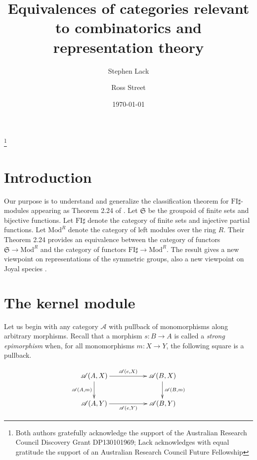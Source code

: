 \documentclass[a4paper,12pt,reqno]{amsart}
\theoremstyle{definition}
\theoremstyle{fact}
\theoremstyle{genquest}
\theoremstyle{step}
\newcommand{\lra}{\longrightarrow}
\def\CA{{\mathscr A}}
\begin{document}
\title{Equivalences of categories relevant to combinatorics and representation theory}

\author{Stephen Lack}
\address{Department of Mathematics, Macquarie University, NSW 2109, Australia}

\author{Ross Street}
\address{Department of Mathematics, Macquarie University, NSW 2109, Australia}

\thanks{Both authors gratefully acknowledge the support of the Australian Research Council Discovery Grant DP130101969; Lack acknowledges with equal gratitude the support of an Australian Research Council Future Fellowship}

\date{\today}
\maketitle

\tableofcontents

\section{Introduction}

Our purpose is to understand and generalize the classification theorem for $\mathrm{FI}\sharp$-modules appearing as Theorem 2.24 of \cite{CEF2012}. 
Let $\mathfrak{S}$ be the groupoid of finite sets and bijective functions.
Let $\mathrm{FI}\sharp$ denote the category of finite sets and injective partial functions.
Let $\mathrm{Mod}^R$ denote the category of left modules over the ring $R$.
Their Theorem 2.24 provides an equivalence between the category of functors
$\mathfrak{S} \lra \mathrm{Mod}^R$ and the category of functors
$\mathrm{FI}\sharp \lra \mathrm{Mod}^R$. 
The result gives a new viewpoint on representations of the symmetric groups,
also a new viewpoint on Joyal species \cite{Species, AnalFunct}.

\section{The kernel module}\label{km}

Let us begin with any category $\CA$ with pullback of monomorphisms along arbitrary morphisms. Recall that a morphism $s : B \lra A$ is called a {\em strong epimorphism} when, for all monomorphisms $m : X \lra Y$, the following square is a pullback.

\begin{eqnarray}\label{strepi}
\begin{aligned}
\xymatrix{
\CA(A,X) \ar[rr]^-{\CA(e,X)} \ar[d]_-{\CA(A,m)} && \CA(B,X) \ar[d]^-{\CA(B,m)} \\
\CA(A,Y) \ar[rr]_-{\CA(e,Y)} && \CA(B,Y)}
\end{aligned}
\end{eqnarray}
\end{document}
